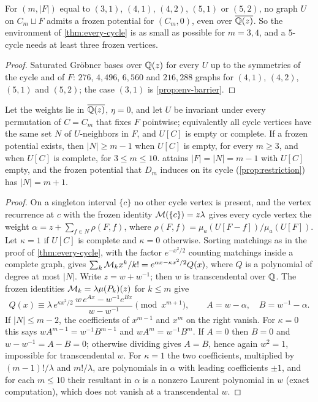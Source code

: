 \begin{proposition}\label{prop:smallest-env}
For $(m,|F|)$ equal to $(3,1)$, $(4,1)$, $(4,2)$, $(5,1)$ or $(5,2)$, no graph $U$ on $C_m\sqcup F$ admits a frozen potential for $(C_m,0)$, even over $\overline{\mathbb{Q}(z)}$. So the environment of \cref{thm:every-cycle} is as small as possible for $m=3,4$, and a $5$-cycle needs at least three frozen vertices.
\end{proposition}
\begin{proof}
Saturated Gr\"obner bases over $\mathbb{Q}(z)$ for every $U$ up to the symmetries of the cycle and of $F$: $276$, $4{,}496$, $6{,}560$ and $216{,}288$ graphs for $(4,1)$, $(4,2)$, $(5,1)$ and $(5,2)$; the case $(3,1)$ is \cref{prop:env-barrier}.
\end{proof}

\begin{proposition}\label{prop:symmetric-env}
Let the weights lie in $\overline{\mathbb{Q}(z)}$, $\eta=0$, and let $U$ be invariant under every permutation of $C=C_m$ that fixes $F$ pointwise; equivalently all cycle vertices have the same set $N$ of $U$-neighbors in $F$, and $U[C]$ is empty or complete. If a frozen potential exists, then $|N|\ge m-1$ when $U[C]$ is empty, for every $m\ge3$, and when $U[C]$ is complete, for $3\le m\le10$.  attains $|F|=|N|=m-1$ with $U[C]$ empty, and the frozen potential that $D_m$ induces on its cycle \textup{(}\cref{prop:restriction}\textup{)} has $|N|=m+1$.
\end{proposition}
\begin{proof}
On a singleton interval $\{c\}$ no other cycle vertex is present, and the vertex recurrence at $c$ with the frozen identity $\mathcal{M}(\{c\})=z\lambda$ gives every cycle vertex the weight $\alpha=z+\sum_{f\in N}\rho(F,f)$, where $\rho(F,f)=\mu_a(U[F-f])/\mu_a(U[F])$. Let $\kappa=1$ if $U[C]$ is complete and $\kappa=0$ otherwise. Sorting matchings as in the proof of \cref{thm:every-cycle}, with the factor $e^{-x^2/2}$ counting matchings inside a complete graph, gives $\sum_k\mathcal{M}_kx^{k}/k!=e^{\alpha x-\kappa x^{2}/2}Q(x)$, where $Q$ is a polynomial of degree at most $|N|$. Write $z=w+w^{-1}$; then $w$ is transcendental over $\mathbb{Q}$. The frozen identities $\mathcal{M}_k=\lambda\mu(P_k)(z)$ for $k\le m$ give
\[
Q(x)\equiv\lambda\,e^{\kappa x^{2}/2}\,\frac{w\,e^{Ax}-w^{-1}e^{Bx}}{w-w^{-1}}\pmod{x^{m+1}},\qquad A=w-\alpha,\quad B=w^{-1}-\alpha.
\]
If $|N|\le m-2$, the coefficients of $x^{m-1}$ and $x^{m}$ on the right vanish. For $\kappa=0$ this says $wA^{m-1}=w^{-1}B^{m-1}$ and $wA^{m}=w^{-1}B^{m}$. If $A=0$ then $B=0$ and $w-w^{-1}=A-B=0$; otherwise dividing gives $A=B$, hence again $w^{2}=1$, impossible for transcendental $w$. For $\kappa=1$ the two coefficients, multiplied by $(m-1)!/\lambda$ and $m!/\lambda$, are polynomials in $\alpha$ with leading coefficients $\pm1$, and for each $m\le10$ their resultant in $\alpha$ is a nonzero Laurent polynomial in $w$ (exact computation), which does not vanish at a transcendental $w$.
\end{proof}

